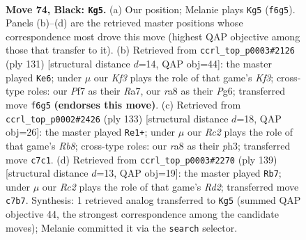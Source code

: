 \documentclass[11pt]{article}
\begin{document}
\clearpage

\begin{figure}[p]\centering
\begin{subfigure}{0.46\textwidth}\centering
\resizebox{\linewidth}{!}{%
\newchessgame
\chessboard[
  setfen={R7/2r2p2/3Rpk2/8/P3P3/5P2/6K1/8 b - - 40 74},
  showmover=false,
  pgfstyle=straightmove, color=movearrow, markmove={f6-g5}
]}
\caption{}
\end{subfigure}\hfill
\begin{subfigure}{0.46\textwidth}\centering
\resizebox{\linewidth}{!}{%
\newchessgame
\chessboard[
  setfen={8/rpR5/5kp1/7p/7P/6P1/5PK1/8 b - - 37 66},
  showmover=false,
  pgfstyle=straightmove, color=movearrow, markmove={f6-e6}
]}
\caption{}
\end{subfigure}
\\[4pt]
\begin{subfigure}{0.46\textwidth}\centering
\resizebox{\linewidth}{!}{%
\newchessgame
\chessboard[
  setfen={8/8/3R1pk1/7p/4P3/4KP1P/8/1r6 b - - 19 67},
  showmover=false,
  pgfstyle=straightmove, color=movearrow, markmove={b1-e1}
]}
\caption{}
\end{subfigure}\hfill
\begin{subfigure}{0.46\textwidth}\centering
\resizebox{\linewidth}{!}{%
\newchessgame
\chessboard[
  setfen={8/3r3p/2R3pk/8/8/7P/6PK/8 b - - 2 70},
  showmover=false,
  pgfstyle=straightmove, color=movearrow, markmove={d7-b7}
]}
\caption{}
\end{subfigure}
\caption{\textbf{Move 74, Black: \texttt{Kg5}.} (a) Our position; Melanie plays \texttt{Kg5} (\texttt{f6g5}). Panels (b)--(d) are the retrieved master positions whose correspondence most drove this move (highest QAP objective among those that transfer to it). (b) Retrieved from \texttt{ccrl\_top\_p0003\#2126} (ply 131) [structural distance $d$=14, QAP obj=44]: the master played \texttt{Ke6}; under $\mu$ our \emph{Kf3} plays the role of that game's \emph{Kf3}; cross-type roles: our \emph{P}f7 as their \emph{R}a7, our \emph{r}a8 as their \emph{P}g6; transferred move \texttt{f6g5} \textbf{(endorses this move)}. (c) Retrieved from \texttt{ccrl\_top\_p0002\#2426} (ply 133) [structural distance $d$=18, QAP obj=26]: the master played \texttt{Re1+}; under $\mu$ our \emph{Rc2} plays the role of that game's \emph{Rb8}; cross-type roles: our \emph{r}a8 as their \emph{p}h3; transferred move \texttt{c7c1}. (d) Retrieved from \texttt{ccrl\_top\_p0003\#2270} (ply 139) [structural distance $d$=13, QAP obj=19]: the master played \texttt{Rb7}; under $\mu$ our \emph{Rc2} plays the role of that game's \emph{Rd2}; transferred move \texttt{c7b7}. Synthesis: 1 retrieved analog transferred to \texttt{Kg5} (summed QAP objective 44, the strongest correspondence among the candidate moves); Melanie committed it via the \texttt{search} selector.}
\label{fig:thought-m147}
\end{figure}
\end{document}
